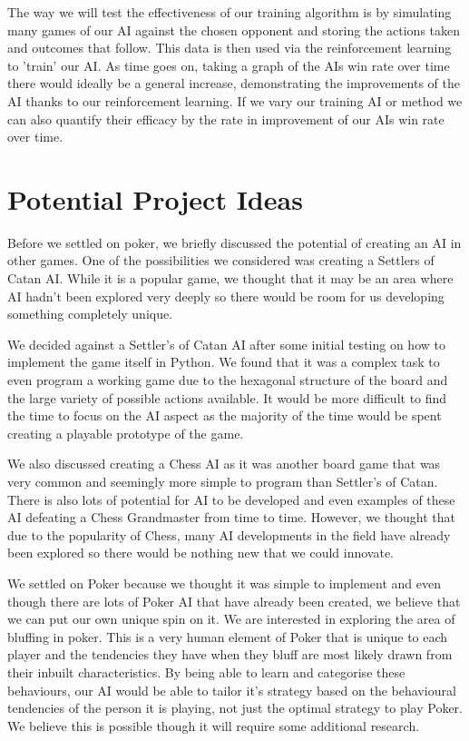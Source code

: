 \documentclass{article}
\begin{document}
\begin{multicols*}{2}
The way we will test the effectiveness of our training algorithm is by simulating many games of our AI against the chosen opponent and storing the actions taken and outcomes that follow. This data is then used via the reinforcement learning to 'train' our AI. As time goes on, taking a graph of the AIs win rate over time there would ideally be a general increase, demonstrating the improvements of the AI thanks to our reinforcement learning. If we vary our training AI or method we can also quantify their efficacy by the rate in improvement of our AIs win rate over time.

\section{Potential Project Ideas}
Before we settled on poker, we briefly discussed the potential of creating an AI in other games. One of the possibilities we considered was creating a Settlers of Catan AI. While it is a popular game, we thought that it may be an area where AI hadn't been explored very deeply so there would be room for us developing something completely unique.
\newline

We decided against a Settler's of Catan AI after some initial testing on how to implement the game itself in Python. We found that it was a complex task to even program a working game due to the hexagonal structure of the board and the large variety of possible actions available. It would be more difficult to find the time to focus on the AI aspect as the majority of the time would be spent creating a playable prototype of the game.
\newline

We also discussed creating a Chess AI as it was another board game that was very common and seemingly more simple to program than Settler's of Catan. There is also lots of potential for AI to be developed and even examples of these AI defeating a Chess Grandmaster from time to time. However, we thought that due to the popularity of Chess, many AI developments in the field have already been explored so there would be nothing new that we could innovate.
\newline

We settled on Poker because we thought it was simple to implement and even though there are lots of Poker AI that have already been created, we believe that we can put our own unique spin on it. We are interested in exploring the area of bluffing in poker. This is a very human element of Poker that is unique to each player and the tendencies they have when they bluff are most likely drawn from their inbuilt characteristics. By being able to learn and categorise these behaviours, our AI would be able to tailor it's strategy based on the behavioural tendencies of the person it is playing, not just the optimal strategy to play Poker. We believe this is possible though it will require some additional research.


\end{multicols*}
\end{document}
